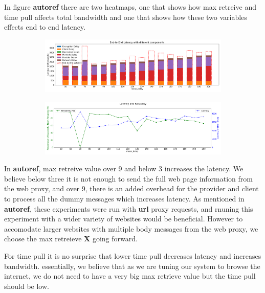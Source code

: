 \documentclass[a4paper,11pt,oneside]{report}
\begin{document}
In figure \textbf{autoref} there are two heatmaps, one that shows how max retreive and time pull affects total bandwidth and one that shows how these two variables effects end to end latency.
\begin{figure}[htbp]
    \centering
    \begin{subfigure}{\textwidth}
        \centering
        \includegraphics[width=\textwidth]{plots/delays_latency_components.png}
        \caption{}
        \label{fig:lambdas_latency}
    \end{subfigure}
    \hfill
    \centering
    \begin{subfigure}{\textwidth}
        \centering
        \includegraphics[width=\textwidth]{plots/delays_reliability_latency.png}
        \caption{}
        \label{fig:heatmap_bandwidth.png}
    \end{subfigure}
\end{figure}


In \textbf{autoref}, max retreive value over 9 and below 3 increases the latency. We believe below three it is not enough to send the full web page information from the web proxy, and over 9, there is an added overhead for the provider and client to process all the dummy messages which increases latency. As mentioned in \textbf{autoref}, these experiments were run with \textbf{url} proxy requests, and rnuning this experiment with a wider variety of websites would be beneficial. However to accomodate larger websites with multiple body messages from the web proxy, we choose the max retreieve \textbf{X} going forward.

For time pull it is no surprise that lower time pull decreases latency and increases bandwidth.
essentially, we believe that as we are tuning our system to browse the internet, we do not need to have a very big max retrieve value but the time pull should be low.
\end{document}
